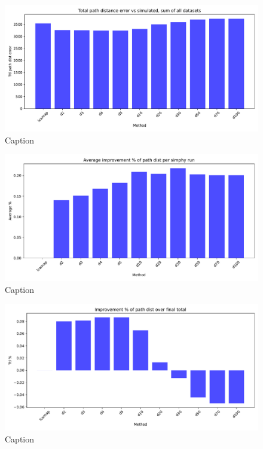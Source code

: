 \documentclass{article}
\begin{document}
\begin{figure}[H]
    \centering
    \includegraphics[width=\textwidth]{plots/dists_loss.pdf}
    \caption{Caption}
    \label{fig:enter-label}
\end{figure}

\begin{figure}
    \centering
    \includegraphics[width=\textwidth]{plots/avgpctimprov_loss.pdf}
    \caption{Caption}
    \label{fig:enter-label}
\end{figure}



\begin{figure}
    \centering
    \includegraphics[width=\textwidth]{plots/pctimprov_loss.pdf}
    \caption{Caption}
    \label{fig:enter-label}
\end{figure}
\end{document}
